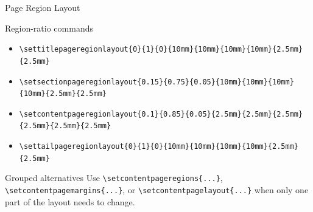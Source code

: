 \documentclass[aspectratio=169,10pt]{beamer}
\begin{document}
\begin{academicframe}{Page Region Layout}
  \begin{block}{Region-ratio commands}
    \scriptsize
    \begin{itemize}
      \item \texttt{\textbackslash settitlepageregionlayout\{0\}\{1\}\{0\}\{10mm\}\{10mm\}\{10mm\}\{10mm\}\{2.5mm\}\{2.5mm\}}
      \item \texttt{\textbackslash setsectionpageregionlayout\{0.15\}\{0.75\}\{0.05\}\{10mm\}\{10mm\}\{10mm\}\{10mm\}\{2.5mm\}\{2.5mm\}}
      \item \texttt{\textbackslash setcontentpageregionlayout\{0.1\}\{0.85\}\{0.05\}\{2.5mm\}\{2.5mm\}\{2.5mm\}\{2.5mm\}\{2.5mm\}\{2.5mm\}}
      \item \texttt{\textbackslash settailpageregionlayout\{0\}\{1\}\{0\}\{10mm\}\{10mm\}\{10mm\}\{10mm\}\{2.5mm\}\{2.5mm\}}
    \end{itemize}
  \end{block}

  \vspace{0.35em}
  \begin{exampleblock}{Grouped alternatives}
    \scriptsize
    Use \texttt{\textbackslash setcontentpageregions\{...\}},
    \texttt{\textbackslash setcontentpagemargins\{...\}}, or
    \texttt{\textbackslash setcontentpagelayout\{...\}} when only one part of
    the layout needs to change.
  \end{exampleblock}
\end{academicframe}
\end{document}
